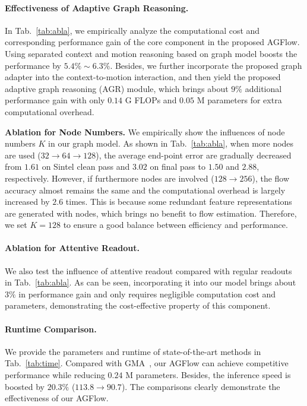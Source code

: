 \documentclass[letterpaper]{article} %
\begin{document}
\paragraph{Effectiveness of Adaptive Graph Reasoning.}
In Tab.~\ref{tab:abla}, we empirically analyze the computational cost and corresponding performance gain of the core component in the proposed AGFlow. Using separated context and motion reasoning based on graph model boosts the performance by $5.4\% \sim 6.3\%$. Besides, we further incorporate the proposed graph adapter into the context-to-motion interaction, and then yield the proposed adaptive graph reasoning (AGR) module, which brings about $9\%$ additional performance gain with only $0.14$ G FLOPs and $0.05$ M parameters for extra computational overhead.

\textbf{Ablation for Node Numbers.} We empirically show the influences of node numbers $K$ in our graph model. As shown in Tab.~\ref{tab:abla}, when more nodes are used ($32 \rightarrow 64 \rightarrow 128$), the average end-point error are gradually decreased from $1.61$ on Sintel clean pass and $3.02$ on final pass to $1.50$ and $2.88$, respectively. However, if furthermore nodes are involved ($128 \rightarrow 256$), the flow accuracy almost remains the same and the computational overhead is largely increased by $2.6$ times. This is because some redundant feature representations are generated with nodes, which brings no benefit to flow estimation. Therefore, we set $K = 128$ to ensure a good balance between efficiency and performance.

\paragraph{Ablation for Attentive Readout.}
We also test the influence of attentive readout compared with regular readouts~\cite{Li2018BeyondGL} in Tab.~\ref{tab:abla}. As can be seen, incorporating it into our model brings about $3\%$ in performance gain and only requires negligible computation cost and parameters, demonstrating the cost-effective property of this component.

\paragraph{Runtime Comparison.}
We provide the parameters and runtime of state-of-the-art methods in Tab.~\ref{tab:time}. Compared with GMA~\cite{Jiang2021LearningTE}, our AGFlow can achieve competitive performance while reducing $0.24$ M parameters. Besides, the inference speed is boosted by $20.3\%$ ($113.8 \rightarrow 90.7$). The comparisons clearly demonstrate the effectiveness of our AGFlow.
\end{document}
